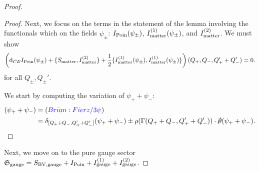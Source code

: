 \documentclass[10pt, oneside]{article}
\begin{document}
\begin{proof}
\begin{proof}
Next, we focus on the terms in the statement of the lemma involving the functionals which on the fields $\psi_{\pm}$: $I_{\rm Poin}(\psi_{\pm})$, $I^{(1)}_{\rm matter}(\psi_{\pm})$, and $I^{(2)}_{\rm matter}$. 
We must show
\[
\left({\rm d}_{CE} I_{\rm Poin}(\psi_\pm) + \{S_{\rm matter}, I_{\rm matter}^{(2)}\} + \frac{1}{2} \{I_{\rm matter}^{(1)}(\psi_\pm), I_{\rm matter}^{(1)}(\psi_\pm)\}\right) (Q_+, Q_-, Q_+' + Q_-') = 0.
\]
for all $Q_\pm, Q_\pm'$.

We start by computing the variation of $\psi_+ + \psi_-$:
\begin{align*}
[\delta_{Q_+ + Q_-}, \delta_{Q_+' + Q_-'}] (\psi_+ + \psi_-) & = \brian{Fierz / 3 \psi} \\ & = \delta_{[Q_+ + Q_-, Q_+' + Q_-']} (\psi_+ + \psi_-) \pm \rho(\Gamma(Q_++Q_-, Q_+' + Q_-')) \cdot \sd \dd (\psi_+ + \psi_-) .
\end{align*}
\end{proof} 

Next, we move on to the pure gauge sector $\mathfrak S_{\rm gauge} = S_{\rm BV, gauge} + I_{\rm Poin} + I^{(1)}_{\rm gauge} + I^{(2)}_{\rm gauge}$. 
\end{proof}
\end{document}
